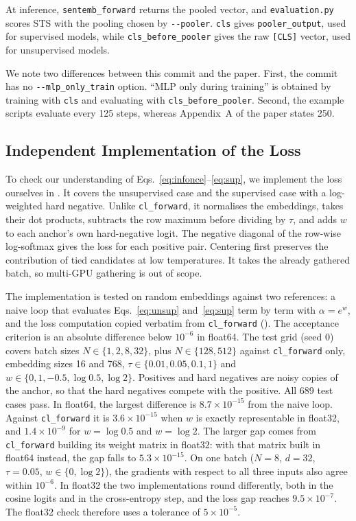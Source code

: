 At inference, \texttt{sentemb\_forward} returns the pooled vector, and
\texttt{evaluation.py} scores STS with the pooling chosen by
\texttt{-{}-pooler}. \texttt{cls} gives \texttt{pooler\_output}, used for
supervised models, while \texttt{cls\_before\_pooler} gives the raw
\texttt{[CLS]} vector, used for unsupervised models.

We note two differences between this commit and the paper. First, the commit
has no \texttt{-{}-mlp\_only\_train} option. ``MLP only during training'' is
obtained by training with \texttt{cls} and evaluating with
\texttt{cls\_before\_pooler}. Second, the example scripts evaluate every 125
steps, whereas Appendix~A of the paper states 250.

\subsection{Independent Implementation of the Loss}
\label{sec:method-infonce}

To check our understanding of Eqs.~\eqref{eq:infonce}--\eqref{eq:sup}, we
implement the loss ourselves in . It
covers the unsupervised case and the supervised case with a log-weighted hard
negative. Unlike \texttt{cl\_forward}, it normalises the embeddings, takes
their dot products, subtracts the row maximum before dividing by $\tau$,
and adds $w$ to each anchor's own hard-negative logit. The negative diagonal
of the row-wise log-softmax gives the loss for each positive pair. Centering
first preserves the contribution of tied candidates at low temperatures.
It takes the already gathered batch, so multi-GPU gathering is out of scope.

The implementation is tested on random embeddings against two references: a
naive loop that evaluates Eqs.~\eqref{eq:unsup} and~\eqref{eq:sup} term by term
with $\alpha=e^{w}$, and the loss computation copied verbatim from
\texttt{cl\_forward} (). The acceptance
criterion is an absolute difference below $10^{-6}$ in float64.
The test grid (seed 0) covers batch sizes $N\in\{1,2,8,32\}$, plus
$N\in\{128,512\}$ against \texttt{cl\_forward} only, embedding sizes 16 and
768, $\tau\in\{0.01,0.05,0.1,1\}$ and
$w\in\{0,1,-0.5,\log 0.5,\log 2\}$. Positives and hard negatives are noisy
copies of the anchor, so that the hard negatives compete with the positive.
All 689 test cases pass. In float64, the largest difference is
$8.7\times10^{-15}$ from the naive loop. Against \texttt{cl\_forward} it is
$3.6\times10^{-15}$ when $w$ is exactly representable in float32, and
$1.4\times10^{-9}$ for $w=\log 0.5$ and $w=\log 2$. The larger gap comes from
\texttt{cl\_forward} building its weight matrix in float32: with that matrix
built in float64 instead, the gap falls to $5.3\times10^{-15}$. On one batch
($N=8$, $d=32$, $\tau=0.05$, $w\in\{0,\log 2\}$), the gradients with respect
to all three inputs also agree within $10^{-6}$. In float32 the two
implementations round differently, both in the cosine logits and in the
cross-entropy step, and the loss gap reaches $9.5\times10^{-7}$. The float32
check therefore uses a tolerance of $5\times10^{-5}$.

